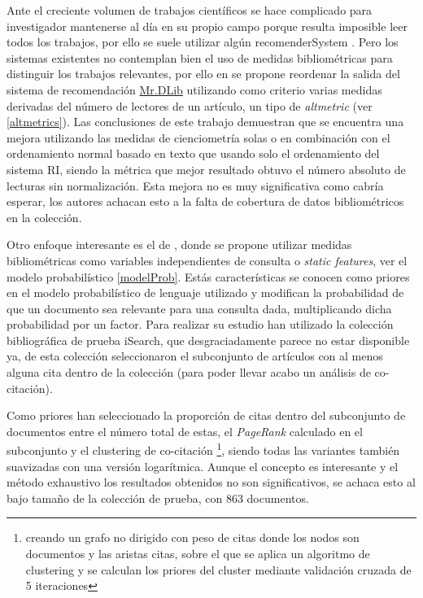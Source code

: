 Ante el creciente volumen de trabajos científicos se hace complicado para investigador mantenerse al día en su propio campo porque resulta imposible leer todos los trabajos, por ello se suele utilizar algún \gls{recomenderSystem} . Pero los sistemas existentes no contemplan bien el uso de medidas bibliométricas para distinguir los trabajos relevantes, por ello en \cite{DBLP:conf/ecir/SiebertDF17} se propone reordenar la salida del sistema de recomendación \href{mr-dlib.org}{\acrshort{Mr.DLib}} utilizando como criterio varias medidas derivadas del número de lectores de un artículo, un tipo de \textit{altmetric} (ver \ref{altmetrics}). Las conclusiones de este trabajo demuestran que se encuentra una mejora utilizando las medidas de cienciometría solas o en combinación con el ordenamiento normal basado en texto que usando solo el ordenamiento del sistema \acrshort{RI}, siendo la métrica que mejor resultado obtuvo el número absoluto de lecturas sin normalización. Esta mejora no es muy significativa como cabría esperar, los autores achacan esto a la falta de cobertura de datos bibliométricos en la colección.

Otro enfoque interesante es el de \cite{DBLP:conf/ecir/ZhaoH14}, donde se propone utilizar medidas bibliométricas como variables independientes de consulta o \textit{static features}, ver el modelo probabilístico \ref{modelProb}. Estás características se conocen como priores en el modelo probabilístico de lenguaje utilizado y modifican la probabilidad de que un documento sea relevante para una consulta dada, multiplicando dicha probabilidad por un factor. Para realizar su estudio han utilizado la colección bibliográfica de prueba iSearch, que desgraciadamente parece no estar disponible ya, de esta colección seleccionaron el subconjunto de artículos con al menos alguna cita dentro de la colección (para poder llevar acabo un análisis de co-citación). 

Como priores han seleccionado la proporción de citas dentro del subconjunto de documentos entre el número total de estas, el \textit{PageRank} calculado en el subconjunto y el clustering de co-citación \footnote{creando un grafo no dirigido con peso de citas donde los nodos son documentos y las aristas citas, sobre el que se aplica un algoritmo de clustering y se calculan los priores del cluster mediante validación cruzada de 5 iteraciones}, siendo todas las variantes también suavizadas con una versión logarítmica. Aunque el concepto es interesante y el método exhaustivo los resultados obtenidos no son significativos, se achaca esto al bajo tamaño de la colección de prueba, con 863 documentos.

